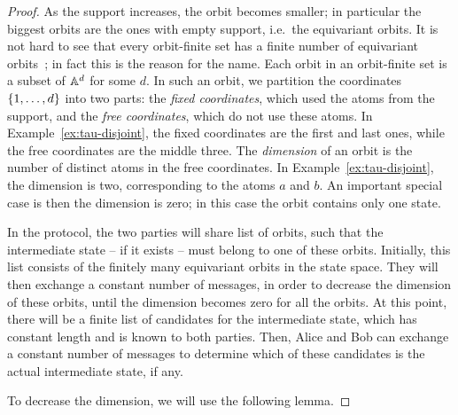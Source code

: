 \begin{proof}
 As the support increases, the orbit becomes smaller; in particular the biggest orbits are the ones with empty support, i.e.~the equivariant orbits. It is not hard to see that every orbit-finite set has a finite number of equivariant orbits~\cite[Lemma 1.4]{bojanczyk_slightly}; in fact this is the reason for the name.  
Each orbit in an orbit-finite set is a subset of $\mathbb A^d$ for some $d$. In such an orbit, we partition the coordinates $\{1,\ldots,d\}$ into two parts: the \emph{fixed coordinates}, which used the atoms from the support, and the \emph{free coordinates}, which do not use these atoms. In Example~\ref{ex:tau-disjoint}, the fixed coordinates are  the first and last ones, while the free coordinates are the middle three. The \emph{dimension} of an orbit is the number of distinct atoms in the free coordinates. In Example~\ref{ex:tau-disjoint}, the dimension is two, corresponding to the atoms $a$ and $b$. 
An important special case is then the dimension is zero; in this case the orbit contains only one state.


In the protocol, the two parties will share list of orbits, such that the intermediate state -- if it exists -- must belong to one of these orbits.  Initially, this list consists of the finitely many equivariant orbits in the state space. They will then exchange a constant number of messages, in order to decrease the dimension of these orbits, until the dimension becomes zero for all  the orbits. At this point, there will be  a finite list of candidates for the intermediate state, which has constant length and is known to both parties. Then, Alice and Bob can exchange a constant number of messages to determine which of these candidates is the actual intermediate state, if any.  
 
To decrease the dimension, we will use the following lemma.



\end{proof}
